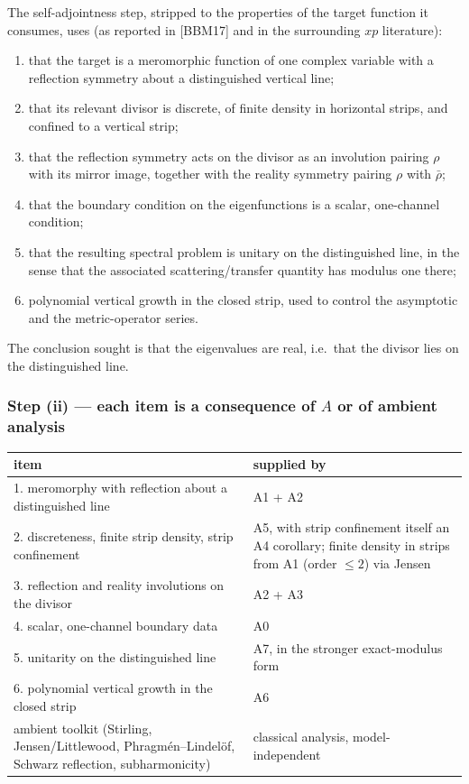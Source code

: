 \documentclass[11pt]{amsart}
\theoremstyle{remark}
\begin{document}
The self-adjointness step, stripped to the properties of the target
function it consumes, uses (as reported in [BBM17] and in the
surrounding $xp$ literature):
\begin{enumerate}
\item that the target is a meromorphic function of one complex variable
with a reflection symmetry about a distinguished vertical line;
\item that its relevant divisor is discrete, of finite density in
horizontal strips, and confined to a vertical strip;
\item that the reflection symmetry acts on the divisor as an involution
pairing $\rho$ with its mirror image, together with the reality symmetry
pairing $\rho$ with $\bar\rho$;
\item that the boundary condition on the eigenfunctions is a scalar,
one-channel condition;
\item that the resulting spectral problem is unitary on the
distinguished line, in the sense that the associated
scattering/transfer quantity has modulus one there;
\item polynomial vertical growth in the closed strip, used to control
the asymptotic and the metric-operator series.
\end{enumerate}
The conclusion sought is that the eigenvalues are real, i.e.\ that the
divisor lies on the distinguished line.

\subsubsection{Step (ii) --- each item is a consequence of $A$ or of ambient analysis}

\begin{center}
\begin{tabular}{p{7.5cm}p{4.5cm}}
\hline
item & supplied by \\
\hline
1. meromorphy with reflection about a distinguished line & A1 + A2 \\
2. discreteness, finite strip density, strip confinement & A5, with strip confinement itself an A4 corollary; finite density in strips from A1 (order $\le2$) via Jensen \\
3. reflection and reality involutions on the divisor & A2 + A3 \\
4. scalar, one-channel boundary data & A0 \\
5. unitarity on the distinguished line & A7, in the stronger exact-modulus form \\
6. polynomial vertical growth in the closed strip & A6 \\
ambient toolkit (Stirling, Jensen/Littlewood, Phragm\'en--Lindel\"of, Schwarz reflection, subharmonicity) & classical analysis, model-independent \\
\hline
\end{tabular}
\end{center}
\end{document}
